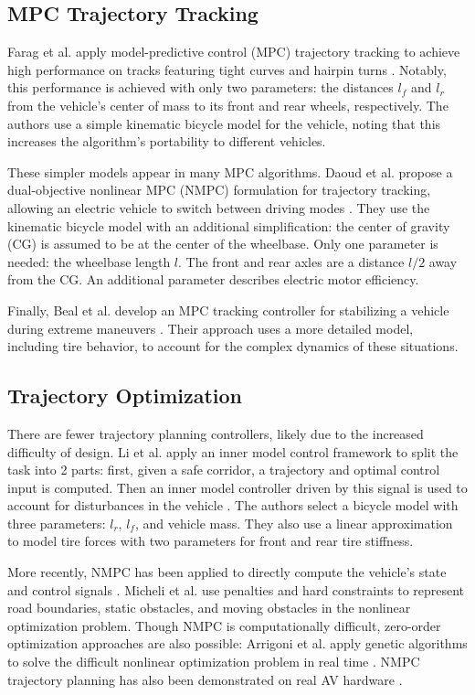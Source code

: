 \documentclass[letterpaper, 10 pt, conference]{ieeeconf}  %
\begin{document}
\subsection{MPC Trajectory Tracking}
Farag et al. apply model-predictive control (MPC) trajectory tracking to achieve high performance on tracks featuring tight curves and hairpin turns \cite{farag}. Notably, this performance is achieved with only two parameters: the distances $l_f$ and $l_r$ from the vehicle's center of mass to its front and rear wheels, respectively. The authors use a simple kinematic bicycle model for the vehicle, noting that this increases the algorithm's portability to different vehicles.

These simpler models appear in many MPC algorithms. Daoud et al. propose  a dual-objective nonlinear MPC (NMPC) formulation for trajectory tracking, allowing an electric vehicle to switch between driving modes \cite{pathfollowingMPC}. They use the kinematic bicycle model with an additional simplification: the center of gravity (CG) is assumed to be at the center of the wheelbase. Only one parameter is needed: the wheelbase length $l$. The front and rear axles are a distance $l/2$ away from the CG. An additional parameter describes electric motor efficiency. 

Finally, Beal et al. develop an MPC tracking controller for stabilizing a vehicle during extreme maneuvers \cite{beal}. Their approach uses a more detailed model, including tire behavior, to account for the complex dynamics of these situations.

\subsection{Trajectory Optimization}

There are fewer trajectory planning controllers, likely due to the increased difficulty of design. Li et al. apply an inner model control framework to split the task into 2 parts: first, given a safe corridor, a trajectory and optimal control input is computed. Then an inner model controller driven by this signal is used to account for disturbances in the vehicle \cite{pathtracking}. The authors select a bicycle model with three parameters: $l_r$, $l_f$, and vehicle mass. They also use a linear approximation to model tire forces with two parameters for front and rear tire stiffness.

More recently, NMPC has been applied to directly compute the vehicle's state and control signals \cite{nmpc_micheli}. Micheli et al. use penalties and hard constraints to represent road boundaries, static obstacles, and moving obstacles in the nonlinear optimization problem.
Though NMPC is computationally difficult, zero-order optimization approaches are also possible: Arrigoni et al. apply genetic algorithms to solve the difficult nonlinear optimization problem in real time \cite{arrigoni2021mpc}. NMPC trajectory planning has also been demonstrated on real AV hardware \cite{nmpc_platform}.
\end{document}
